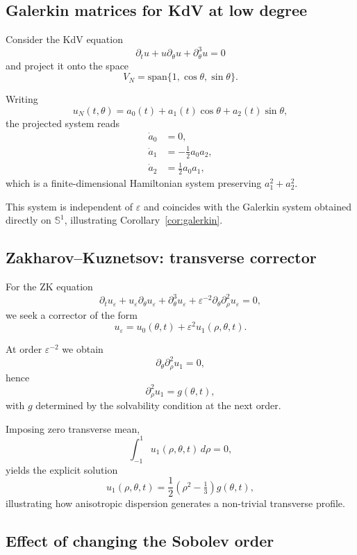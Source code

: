 \documentclass[11pt]{amsart}
\theoremstyle{plain}
\theoremstyle{definition}
\theoremstyle{remark}
\theoremstyle{remark}
\begin{document}
\subsection{Galerkin matrices for KdV at low degree}

Consider the KdV equation
\[
\partial_t u + u\partial_\theta u + \partial_\theta^3 u=0
\]
and project it onto the space
\[
V_N=\mathrm{span}\{1,\cos\theta,\sin\theta\}.
\]

Writing
\[
u_N(t,\theta)=a_0(t)+a_1(t)\cos\theta+a_2(t)\sin\theta,
\]
the projected system reads
\[
\begin{aligned}
\dot a_0 &= 0,\\
\dot a_1 &= -\tfrac12 a_0 a_2,\\
\dot a_2 &= \tfrac12 a_0 a_1,
\end{aligned}
\]
which is a finite-dimensional Hamiltonian system preserving
$a_1^2+a_2^2$.

This system is independent of $\varepsilon$ and coincides with the Galerkin
system obtained directly on $\mathbb S^1$, illustrating
Corollary~\ref{cor:galerkin}.

\subsection{Zakharov--Kuznetsov: transverse corrector}

For the ZK equation
\[
\partial_t u_\varepsilon
+
u_\varepsilon\partial_\theta u_\varepsilon
+
\partial_\theta^3 u_\varepsilon
+
\varepsilon^{-2}\partial_\theta\partial_\rho^2 u_\varepsilon
=0,
\]
we seek a corrector of the form
\[
u_\varepsilon=u_0(\theta,t)+\varepsilon^2 u_1(\rho,\theta,t).
\]

At order $\varepsilon^{-2}$ we obtain
\[
\partial_\theta\partial_\rho^2 u_1=0,
\]
hence
\[
\partial_\rho^2 u_1 = g(\theta,t),
\]
with $g$ determined by the solvability condition at the next order.

Imposing zero transverse mean,
\[
\int_{-1}^1 u_1(\rho,\theta,t)\,d\rho=0,
\]
yields the explicit solution
\[
u_1(\rho,\theta,t)
=
\frac12(\rho^2-\tfrac13)g(\theta,t),
\]
illustrating how anisotropic dispersion generates a non-trivial transverse
profile.

\subsection{Effect of changing the Sobolev order}
\end{document}
